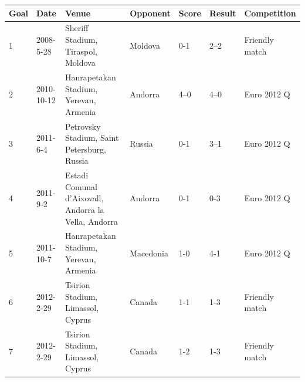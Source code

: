 \documentclass{article}
\begin{document}
\begin{tabular}{lllllll}
\toprule
Goal & Date & Venue & Opponent & Score & Result & Competition \\
\midrule
1 & 2008-5-28 & Sheriff Stadium, Tiraspol, Moldova & Moldova & 0-1 & 2–2 & Friendly match \\
2 & 2010-10-12 & Hanrapetakan Stadium, Yerevan, Armenia & Andorra & 4–0 & 4–0 & Euro 2012 Q \\
3 & 2011-6-4 & Petrovsky Stadium, Saint Petersburg, Russia & Russia & 0-1 & 3–1 & Euro 2012 Q \\
4 & 2011-9-2 & Estadi Comunal d'Aixovall, Andorra la Vella, Andorra & Andorra & 0-1 & 0-3 & Euro 2012 Q \\
5 & 2011-10-7 & Hanrapetakan Stadium, Yerevan, Armenia & Macedonia & 1-0 & 4-1 & Euro 2012 Q \\
6 & 2012-2-29 & Tsirion Stadium, Limassol, Cyprus & Canada & 1-1 & 1-3 & Friendly match \\
7 & 2012-2-29 & Tsirion Stadium, Limassol, Cyprus & Canada & 1-2 & 1-3 & Friendly match \\
\bottomrule
\end{tabular}
\end{document}
